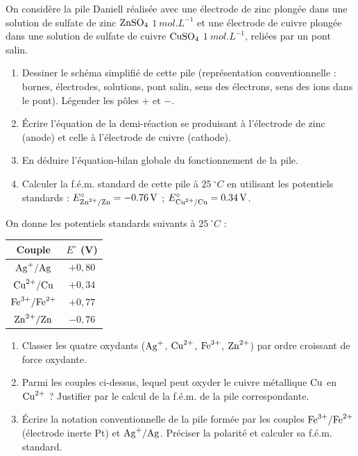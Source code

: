 \documentclass[11pt]{article}
\begin{document}
\begin{exercice}
On considère la pile Daniell réalisée avec une électrode de zinc plongée dans une solution de sulfate de zinc $\ce{ZnSO4}$ $\SI{1}{mol.L^{-1}}$ et une électrode de cuivre plongée dans une solution de sulfate de cuivre $\ce{CuSO4}$ $\SI{1}{mol.L^{-1}}$, reliées par un pont salin.
\begin{enumerate}
    \item Dessiner le schéma simplifié de cette pile (représentation conventionnelle : bornes, électrodes, solutions, pont salin, sens des électrons, sens des ions dans le pont). Légender les pôles $+$ et $-$.
    \item Écrire l'équation de la demi-réaction se produisant à l'électrode de zinc (anode) et celle à l'électrode de cuivre (cathode).
    \item En déduire l'équation-bilan globale du fonctionnement de la pile.
    \item Calculer la f.é.m. standard de cette pile à $\SI{25}{^\circ C}$ en utilisant les potentiels standards : $E^\circ_{\ce{Zn^{2+}/Zn}} = \SI{-0,76}{V}$ ; $E^\circ_{\ce{Cu^{2+}/Cu}} = \SI{+0,34}{V}$.
\end{enumerate}
\end{exercice}

\begin{exercice}
On donne les potentiels standards suivants à $\SI{25}{^\circ C}$ :
\begin{center}
\begin{tabular}{c c}
\hline
Couple & $E^\circ$ (V) \\
\hline
$\ce{Ag+/Ag}$ & $+0,80$ \\
$\ce{Cu^{2+}/Cu}$ & $+0,34$ \\
$\ce{Fe^{3+}/Fe^{2+}}$ & $+0,77$ \\
$\ce{Zn^{2+}/Zn}$ & $-0,76$ \\
\hline
\end{tabular}
\end{center}
\begin{enumerate}
    \item Classer les quatre oxydants ($\ce{Ag+}$, $\ce{Cu^{2+}}$, $\ce{Fe^{3+}}$, $\ce{Zn^{2+}}$) par ordre croissant de force oxydante.
    \item Parmi les couples ci-dessus, lequel peut oxyder le cuivre métallique $\ce{Cu}$ en $\ce{Cu^{2+}}$ ? Justifier par le calcul de la f.é.m. de la pile correspondante.
    \item Écrire la notation conventionnelle de la pile formée par les couples $\ce{Fe^{3+}/Fe^{2+}}$ (électrode inerte Pt) et $\ce{Ag+/Ag}$. Préciser la polarité et calculer sa f.é.m. standard.
\end{enumerate}
\end{exercice}
\end{document}
